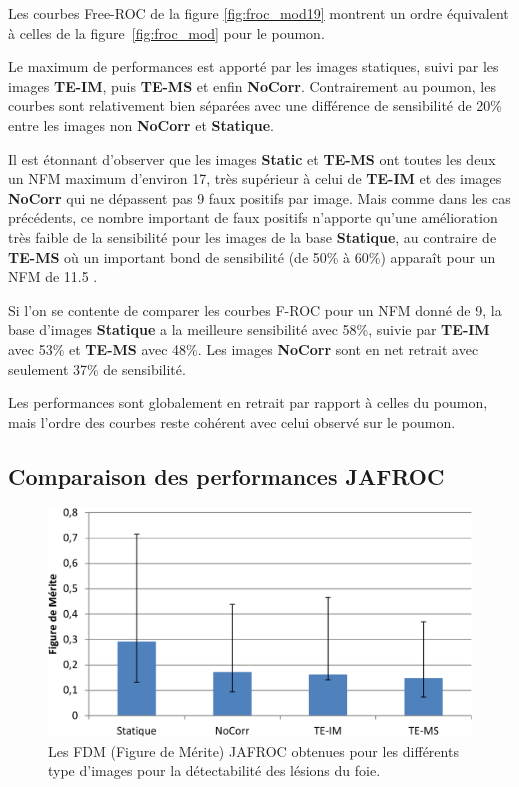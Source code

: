 Les courbes Free-ROC de la figure \ref{fig:froc_mod19} montrent un ordre équivalent à celles de la figure~\ref{fig:froc_mod} pour le poumon.

Le maximum de performances est apporté par les images statiques, suivi par les images \textbf{TE-IM}, puis \textbf{TE-MS} et enfin \textbf{NoCorr}. Contrairement au poumon, les courbes sont relativement bien séparées avec une différence de sensibilité de 20\% entre les images non \textbf{NoCorr} et \textbf{Statique}. 

Il est étonnant d'observer que les images \textbf{Static} et \textbf{TE-MS} ont toutes les deux un NFM maximum d'environ 17, très supérieur à celui de \textbf{TE-IM} et des images \textbf{NoCorr} qui ne dépassent pas 9 faux positifs par image. Mais comme dans les cas précédents, ce nombre important de faux positifs n'apporte qu'une amélioration très faible de la sensibilité pour les images de la base \textbf{Statique}, au contraire de \textbf{TE-MS} où un important bond de sensibilité (de 50\% à 60\%) apparaît pour un NFM de 11.5 . 

Si l'on se contente de comparer les courbes F-ROC pour un NFM donné de 9, la base d'images \textbf{Statique} a la meilleure sensibilité avec 58\%, suivie par \textbf{TE-IM} avec 53\% et \textbf{TE-MS} avec 48\%. Les images \textbf{NoCorr} sont en net retrait avec seulement 37\% de sensibilité.

Les performances sont globalement en retrait par rapport à celles du poumon, mais l'ordre des courbes reste cohérent avec celui observé sur le poumon.


\subsection{Comparaison des performances JAFROC}

\begin{figure}[h!]
 \begin{center}
   \includegraphics[width=15cm]{images/FOM_mod19}
 \end{center}
 \caption{Les FDM (Figure de Mérite) JAFROC obtenues pour les différents type d'images pour la détectabilité des lésions du foie.}
 \label{fig:fom_mod19} 
\end{figure}


